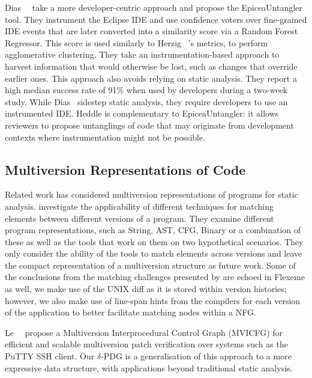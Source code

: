 Dias~\etal~\cite{Dias2015} take a more developer-centric approach and propose
the EpiceaUntangler tool. They instrument the Eclipse IDE and use confidence
voters over fine-grained IDE events that are later converted into a similarity
score via a Random Forest Regressor. This score is used similarly to Herzig
\etal~\cite{Herzig2016}'s metrics, \ie to perform agglomerative clustering. They
take an instrumentation-based approach to harvest information that would
otherwise be lost, such as changes that override earlier ones. This approach
also avoids relying on static analysis. They report a high median success rate
of 91\% when used by developers during a two-week study. While Dias~\etal
sidestep static analysis, they require developers to use an instrumented IDE.
Heddle is complementary to EpiceaUntangler: it allows reviewers to propose
untanglings of code that may originate from development contexts where
instrumentation might not be possible.

\subsection{Multiversion Representations of Code}
\label{chapter:literature:sec:flexeme_rel_work:multiversion_repr}

Related work has considered multiversion representations of programs for static
analysis. \citet{kim2006program} investigate the applicability of different
techniques for matching elements between different versions of a program. They
examine different program representations, such as String, AST, CFG, Binary or a
combination of these as well as the tools that work on them on two hypothetical
scenarios. They only consider the ability of the tools to match elements across
versions and leave the compact representation of a multiversion structure as
future work. Some of the conclusions from the matching challenges presented by
\citet{kim2006program} are echoed in Flexeme as well, we make use of the UNIX
diff as it is stored within version histories; however, we also make use of
line-span hints from the compilers for each version of the application to better
facilitate matching nodes within a NFG.

Le~\etal~\cite{Le2014} propose a Multiversion Interprocedural Control Graph
(MVICFG) for efficient and scalable multiversion patch verification over systems
such as the PuTTY SSH client. Our $\delta$-PDG is a generalisation of this
approach to a more expressive data structure, with applications beyond
traditional static analysis. 

